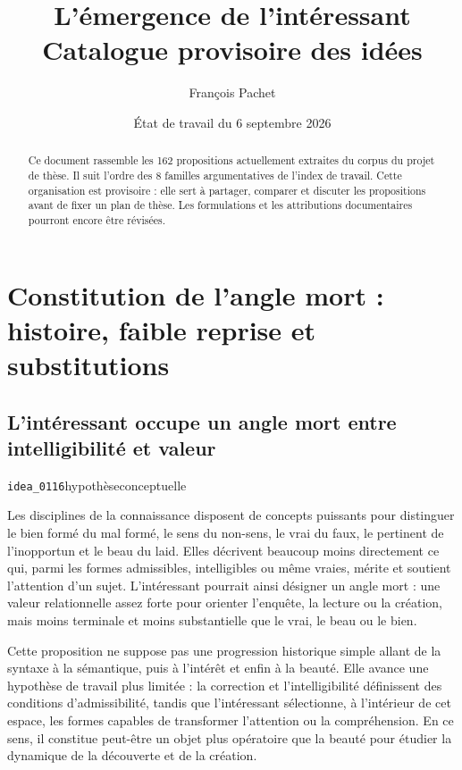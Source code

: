 \documentclass[10pt,a4paper]{article}
\title{L'émergence de l'intéressant\\\large Catalogue provisoire des idées}
\author{François Pachet}
\date{État de travail du 6 septembre 2026}
\begin{document}
\maketitle

\begin{abstract}
Ce document rassemble les 162 propositions actuellement extraites du corpus du projet de thèse. Il suit l'ordre des 8 familles argumentatives de l'index de travail. Cette organisation est provisoire : elle sert à partager, comparer et discuter les propositions avant de fixer un plan de thèse. Les formulations et les attributions documentaires pourront encore être révisées.
\end{abstract}

\tableofcontents
\clearpage
\section{Constitution de l'angle mort : histoire, faible reprise et substitutions}

\subsection{L'intéressant occupe un angle mort entre intelligibilité et valeur}
{\small\color{metadata} \texttt{idea\_0116}\quad\textbullet\quad hypothèse\quad\textbullet\quad conceptuelle\par}

Les disciplines de la connaissance disposent de concepts puissants pour distinguer le bien formé du mal formé, le sens du non-sens, le vrai du faux, le pertinent de l'inopportun et le beau du laid. Elles décrivent beaucoup moins directement ce qui, parmi les formes admissibles, intelligibles ou même vraies, mérite et soutient l'attention d'un sujet. L'intéressant pourrait ainsi désigner un angle mort : une valeur relationnelle assez forte pour orienter l'enquête, la lecture ou la création, mais moins terminale et moins substantielle que le vrai, le beau ou le bien.

Cette proposition ne suppose pas une progression historique simple allant de la syntaxe à la sémantique, puis à l'intérêt et enfin à la beauté. Elle avance une hypothèse de travail plus limitée : la correction et l'intelligibilité définissent des conditions d'admissibilité, tandis que l'intéressant sélectionne, à l'intérieur de cet espace, les formes capables de transformer l'attention ou la compréhension. En ce sens, il constitue peut-être un objet plus opératoire que la beauté pour étudier la dynamique de la découverte et de la création.
\end{document}
